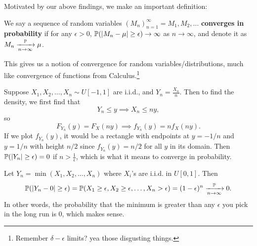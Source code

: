 \documentclass[11 pt]{scrartcl}
\begin{document}
Motivated by our above findings, we make an important definition: 

\begin{definition}
    We say a sequence of random variables $(M_n)_{n=1}^\infty = M_1, M_2, \dots$ \textbf{converges in probability} if for any $\epsilon > 0$, $\mathbb P(|M_n-\mu| \geq \epsilon)\to\infty$ as $n\to\infty$, and denote it as $M_n\xrightarrow[n\to\infty]{\mathbb P} \mu$. 
\end{definition}

This gives us a notion of convergence for random variables/distributions, much like convergence of functions from Calculus.\footnote{Remember $\delta - \epsilon$ limits? yea those disgusting things.}

\begin{example}
    Suppose $X_1, X_2, \dots, X_n \sim U[-1, 1]$ are i.i.d., and $Y_n = \frac{X_n}{n}$. Then to find the density, we first find that 
    \[ Y_n \leq y \implies X_n \leq ny,\]
    so 
    \[ F_{Y_n}(y) = F_X(ny) \implies f_{Y_n}(y) = n f_X(ny). \] 
    If we plot $f_{Y_n}(y)$, it would be a rectangle with endpoints at $y = -1/n$ and $y = 1/n$ with height $n/2$ since $f_{Y_n}(y) = n/2$ for all $y$ in its domain. Then $\mathbb P(|Y_n| \geq \epsilon) = 0$ if $n > \frac{1}{\epsilon}$, which is what it means to converge in probability. 
\end{example}

\begin{example}
    Let $Y_n = \min(X_1, X_2, \dots, X_n)$ where $X_i$'s are i.i.d. in $U[0,1]$. Then 
    \[ \mathbb P(|Y_n - 0| \geq \epsilon) = \mathbb P(X_1\geq \epsilon, X_2\geq \epsilon, \dots, X_n > \epsilon) = (1-\epsilon)^n \xrightarrow[n\to\infty]{\mathbb P} 0 .\] 
    In other words, the probability that the minimum is greater than any $\epsilon$ you pick in the long run is $0$, which makes sense. 
\end{example}
\end{document}
